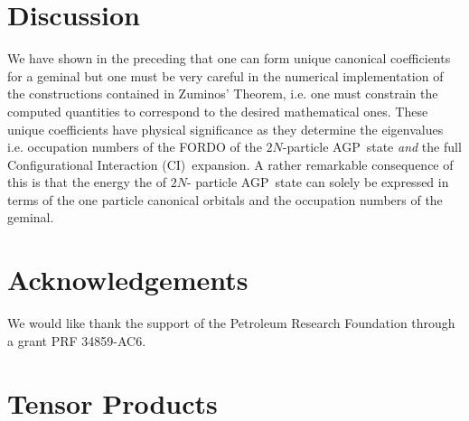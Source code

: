 \documentclass[aps,preprint]{revtex4}%
\begin{document}
\section{Discussion\label{discussion}}

We have shown in the preceding that one can form unique canonical coefficients
for a geminal but one must be very careful in the numerical implementation of
the constructions contained in Zuminos' Theorem, i.e. one must constrain the
computed quantities to correspond to the desired mathematical ones. These
unique coefficients have physical significance as they determine the
eigenvalues i.e. occupation numbers of the FORDO of the $2N$-particle
AGP\ state \emph{and} the full Configurational Interaction (CI)\ expansion. A
rather remarkable consequence of this is that the energy the of $2N$- particle
AGP\ state can solely be expressed in terms of the one particle canonical
orbitals and the occupation numbers of the geminal.

\section{Acknowledgements}

We would like thank the support of the Petroleum Research Foundation through a
grant PRF 34859-AC6.

\appendix


\section{Tensor Products\label{tensor}}
\end{document}

